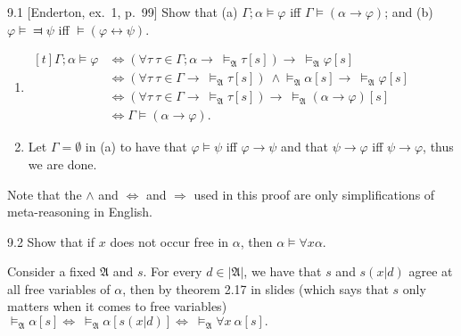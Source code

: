 
\begin{exercise}{9.1}
  [Enderton, ex.~1, p.~99]
  Show that (a) $\Gamma;\alpha\vDash \varphi$ iff $\Gamma\vDash(\alpha\to \varphi)$; and (b) $\varphi\vDash\Dashv \psi$ iff $\vDash(\varphi \leftrightarrow \psi).$
\end{exercise}

\begin{enumerate}[label=(\alph*)]
  \item
        $\begin{aligned}[t]
            \Gamma;\alpha\vDash \varphi & \Leftrightarrow(\forall\tau\ \tau\in\Gamma;\alpha\rightarrow\ \vDash_{\mathfrak{A}}\tau[s])\rightarrow\ \vDash_{\mathfrak{A}}\varphi[s]                                 \\
                                        & \Leftrightarrow(\forall\tau\ \tau\in \Gamma\rightarrow\ \vDash_{\mathfrak{A}}\tau[s])\ \wedge\vDash_{\mathfrak{A}}\alpha[s]\rightarrow\ \vDash_{\mathfrak{A}}\varphi[s] \\
                                        & \Leftrightarrow(\forall\tau\ \tau\in \Gamma\rightarrow\ \vDash_{\mathfrak{A}}\tau[s])\rightarrow\ \vDash_{\mathfrak{A}}(\alpha\rightarrow \varphi)[s]                   \\
                                        & \Leftrightarrow \Gamma\vDash (\alpha\rightarrow \varphi).
          \end{aligned}$
  \item Let $\Gamma=\emptyset$ in (a) to have that $\varphi\vDash \psi$ iff $\varphi\to \psi$ and that $\psi\to\varphi$ iff $\psi\to \varphi$, thus we are done.
\end{enumerate}
Note that the $\wedge$ and $\Leftrightarrow$ and $\Rightarrow$ used in this proof are only simplifications of meta-reasoning in English.

\begin{exercise}{9.2}
  Show that if $x$ does not occur free in $\alpha$, then $\alpha\vDash\forall x \alpha$.
\end{exercise}

Consider a fixed $\mathfrak{A}$ and $s$. For every $d\in|\mathfrak{A}|$, we have that $s$ and $s(x|d)$ agree at all free variables of $\alpha$, then by theorem 2.17 in slides (which says that $s$ only matters when it comes to free variables) $\vDash_{\mathfrak{A}}\alpha[s]\Leftrightarrow\ \vDash_{\mathfrak{A}}\alpha[s(x|d)]\Leftrightarrow\ \vDash_{\mathfrak{A}}\forall x\ \alpha[s].$


